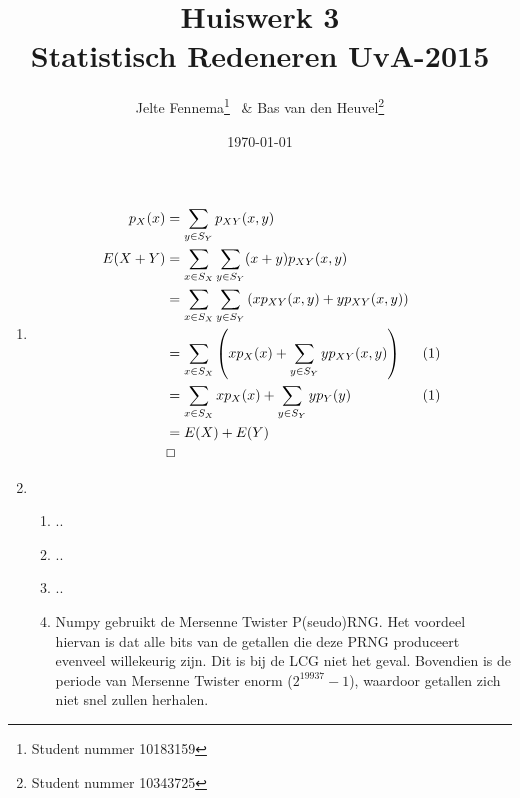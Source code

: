 \documentclass{article}
\title{Huiswerk 3\\ \large{Statistisch Redeneren UvA-2015}}
\author{Jelte Fennema\thanks{Student nummer 10183159} ~\& Bas van den
Heuvel\thanks{Student nummer 10343725}}
\date{\today}
\begin{document}
\maketitle

\begin{enumerate}
    \item
        \begin{align}
            p_X(x) &= \sum_{y \in S_Y} p_{XY}(x, y) \\
            E(X+Y) &= \sum_{x \in S_X} \sum_{y \in S_Y} (x+y)p_{XY}(x,y) \notag \\
                   &= \sum_{x \in S_X} \sum_{y \in S_Y} \left(xp_{XY}(x, y)
            +yp_{XY}(x, y) \right) \notag \\
                   &= \sum_{x \in S_X} \left(xp_X(x) + \sum_{y \in S_Y}
            yp_{XY}(x,y)\right)
            & (1) \notag \\
                   &= \sum_{x \in S_X} xp_X(x) + \sum_{y \in S_Y} yp_Y(y) & (1)
            \notag \\
                   &= E(X) + E(Y) \notag \\
                   & \Box \notag
        \end{align}

    \item
        \begin{enumerate}[1.]
            \item ..

            \item ..

            \item ..

            \item
                Numpy gebruikt de Mersenne Twister P(seudo)RNG. Het voordeel hiervan is
                dat alle bits van de getallen die deze PRNG produceert evenveel
                willekeurig zijn. Dit is bij de LCG niet het geval. Bovendien is de
                periode van Mersenne Twister enorm ($2^{19937}-1$), waardoor getallen
                zich niet snel zullen herhalen.

        \end{enumerate}

\end{enumerate}
\end{document}
